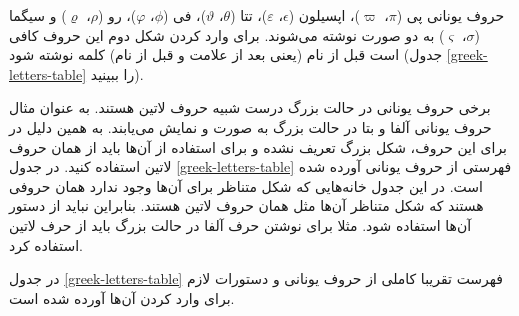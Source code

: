 \begin{note}
حروف یونانی پی ($\pi$، $\varpi$)، اپسیلون ($\epsilon$، $\varepsilon$)، تتا
($\theta$، $\vartheta$)، فی ($\phi$، $\varphi$)، رو ($\rho$، $\varrho$) و سیگما
($\sigma$، $\varsigma$) به دو صورت نوشته می‌شوند. برای وارد کردن شکل دوم این
حروف کافی است قبل از نام (یعنی بعد از علامت \lr{\textbackslash} و قبل از نام)
کلمه  نوشته شود (جدول \ref{greek-letters-table} را ببینید).
\end{note}

\begin{note}
برخی حروف یونانی در حالت بزرگ درست شبیه حروف لاتین هستند. به عنوان مثال حروف
یونانی آلفا و بتا در حالت بزرگ به صورت  و  نمایش می‌یابند.
به همین دلیل در \lr{\LaTeX} برای این حروف، شکل بزرگ تعریف نشده و برای استفاده از
آن‌ها باید از همان حروف لاتین استفاده کنید. در جدول \ref{greek-letters-table}
فهرستی از حروف یونانی آورده شده است. در این جدول خانه‌هایی که شکل متناظر برای
آن‌ها وجود ندارد همان حروفی هستند که شکل متناظر آن‌ها مثل همان حروف لاتین هستند.
بنابراین نباید از دستور آن‌ها استفاده شود. مثلا برای نوشتن حرف آلفا در حالت بزرگ
باید از حرف لاتین  استفاده کرد.
\end{note}


در جدول \ref{greek-letters-table} فهرست تقریبا کاملی از حروف یونانی و دستورات لازم برای وارد کردن
آن‌ها آورده شده است.

